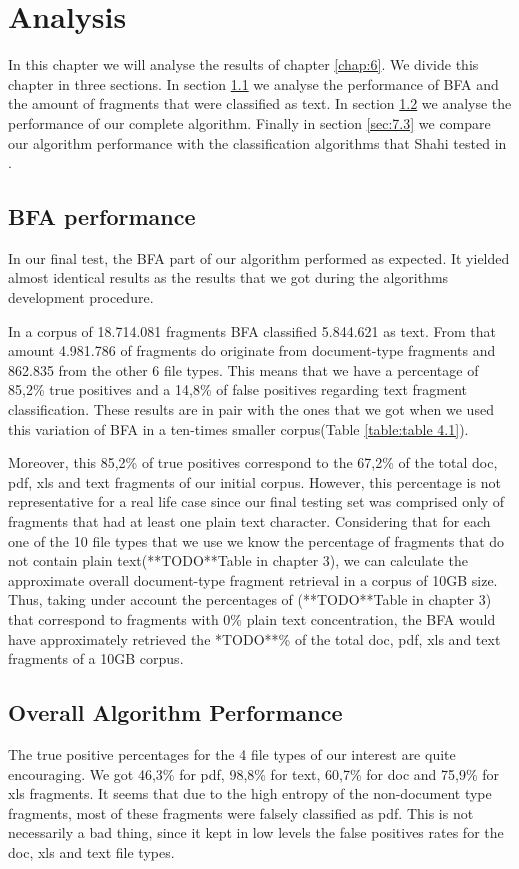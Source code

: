 \chapter{Analysis}
In this chapter we will analyse the results of chapter \ref{chap:6}. We divide this chapter in three sections. In section \ref{sec:7.1} we analyse the performance of BFA and the amount of fragments that were classified as text. In section  \ref{sec:7.2} we analyse the performance of our complete algorithm. Finally in section  \ref{sec:7.3} we compare our algorithm performance with the classification algorithms that Shahi tested in \cite{Shahi}.

\section{BFA performance}\label{sec:7.1}
In our final test, the BFA part of our algorithm performed as expected. It yielded almost identical results as the results that we got during the algorithms development procedure.

 In a corpus of 18.714.081 fragments BFA classified 5.844.621 as text. From that amount 4.981.786 of fragments do originate from document-type fragments and 862.835 from the other 6 file types. This means that we have a percentage of 85,2\% true positives and a 14,8\% of false positives regarding text fragment classification. These results are in pair with the ones that we got when we used this variation of BFA in a ten-times smaller corpus(Table \ref{table:table 4.1}).

Moreover, this 85,2\% of true positives correspond to the 67,2\% of the total doc, pdf, xls and text fragments of our initial corpus. However, this percentage is not representative for a real life case since our final testing set was comprised only of fragments that had at least one plain text character. Considering that for each one of the 10 file types that we use we know the percentage of fragments that do not contain plain text(**TODO**Table in chapter 3), we can calculate the approximate overall document-type fragment retrieval in a corpus of 10GB size. Thus, taking under account the percentages of (**TODO**Table in chapter 3) that correspond to fragments with 0\% plain text concentration, the BFA would have approximately retrieved the *TODO**\% of the total doc, pdf, xls and text fragments of a 10GB corpus.

\section{Overall Algorithm Performance}\label{sec:7.2}
The true positive percentages for the 4 file types of our interest are quite encouraging. We got 46,3\% for pdf, 98,8\% for text, 60,7\% for doc and 75,9\% for xls fragments. It seems that due to the high entropy of the non-document type fragments, most of these fragments were falsely classified as pdf. This is not necessarily a bad thing, since it kept in low levels the false positives rates for the doc, xls and text file types.

